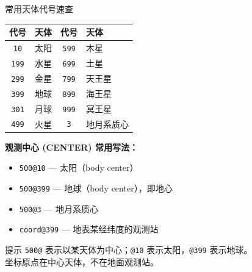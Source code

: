\documentclass[aspectratio=169]{ctexbeamer}
\begin{document}
\begin{frame}{常用天体代号速查}
\small

\begin{center}
\begin{tabular}{c|l|c|l}
\toprule
\textbf{代号} & \textbf{天体} & \textbf{代号} & \textbf{天体} \\
\midrule
\texttt{10}   & 太阳         & \texttt{599}  & 木星 \\
\texttt{199}  & 水星         & \texttt{699}  & 土星 \\
\texttt{299}  & 金星         & \texttt{799}  & 天王星 \\
\texttt{399}  & 地球         & \texttt{899}  & 海王星 \\
\texttt{301}  & 月球         & \texttt{999}  & 冥王星 \\
\texttt{499}  & 火星         & \texttt{3}     & 地月系质心 \\
\bottomrule
\end{tabular}
\end{center}

\vspace{0.2cm}

\textbf{观测中心 (CENTER) 常用写法：}

\begin{itemize}
  \setlength\itemsep{3pt}
  \item \texttt{500@10} — 太阳（body center）
  \item \texttt{500@399} — 地球（body center），即地心
  \item \texttt{500@3} — 地月系质心
  \item \texttt{coord@399} — 地表某经纬度的观测站
\end{itemize}

\vspace{0.2cm}

\begin{alertblock}{提示}
  \texttt{500@} 表示以某天体为中心；\texttt{@10} 表示太阳，\texttt{@399} 表示地球。\\
  坐标原点在中心天体，不在地面观测站。
\end{alertblock}
\end{frame}
\end{document}
